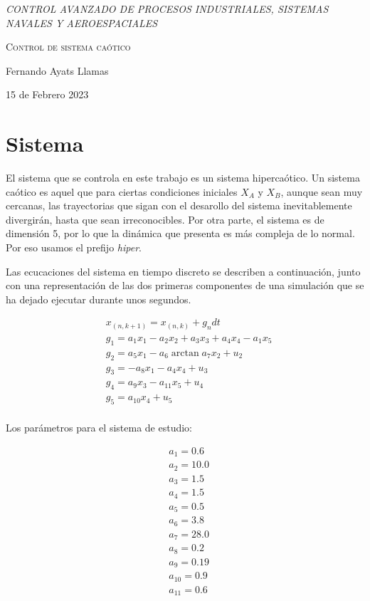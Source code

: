 \documentclass[DIV=20]{scrartcl}
\begin{document}
\begin{titlepage}
	\centering
	\vspace{3cm}
	{\itshape\Large CONTROL AVANZADO DE PROCESOS INDUSTRIALES, SISTEMAS NAVALES Y AEROESPACIALES	 \par}
	\vspace{3cm}
	{\scshape\Huge Control de sistema caótico \par}
	\vfill
	{\Large Fernando Ayats Llamas \par}
	{\Large 15 de Febrero 2023 \par}
\end{titlepage}

\section{Sistema}

El sistema que se controla en este trabajo es un sistema hipercaótico. Un
sistema caótico es aquel que para ciertas condiciones iniciales $X_A$ y $X_B$,
aunque sean muy cercanas, las trayectorias que sigan con el desarollo del
sistema inevitablemente divergirán, hasta que sean irreconocibles.
Por otra parte, el sistema es de dimensión 5, por lo que la dinámica que
presenta es más compleja de lo normal. Por eso usamos el prefijo \emph{hiper}.

Las ecucaciones del sistema en tiempo discreto se describen a continuación,
junto con una representación de las dos primeras componentes de una simulación
que se ha dejado ejecutar durante unos segundos.


\begin{align*}
	 & x_{(n, k+1)} = x_{(n, k)} + g_n  dt                   \\
	 & g_1 = a_1 x_1 - a_2 x_2 + a_3 x_3 + a_4 x_4 - a_1 x_5 \\
	 & g_2 = a_5 x_1 - a_6 \arctan{a_7 x_2} + u_2            \\
	 & g_3 = - a_8 x_1 - a_4 x_4 + u_3                       \\
	 & g_4 = a_9 x_3 - a_{11} x_5 + u_4                      \\
	 & g_5 = a_{10} x _4 + u_5                               \\
\end{align*}

Los parámetros para el sistema de estudio:

\begin{align*}
	 & a_1 = 0.6    \\
	 & a_2 = 10.0   \\
	 & a_3 = 1.5    \\
	 & a_4 = 1.5    \\
	 & a_5 = 0.5    \\
	 & a_6 = 3.8    \\
	 & a_7 = 28.0   \\
	 & a_8 = 0.2    \\
	 & a_9 = 0.19   \\
	 & a_{10} = 0.9 \\
	 & a_{11} = 0.6 \\
\end{align*}
\end{document}

